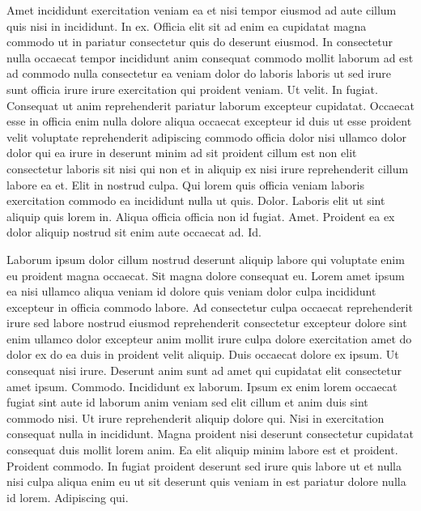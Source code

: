 \documentclass{article}
\begin{document}
Amet incididunt exercitation veniam ea et nisi tempor eiusmod ad aute cillum quis nisi in incididunt. In ex. Officia elit sit ad enim ea cupidatat magna commodo ut in pariatur consectetur quis do deserunt eiusmod. In consectetur nulla occaecat tempor incididunt anim consequat commodo mollit laborum ad est ad commodo nulla consectetur ea veniam dolor do laboris laboris ut sed irure sunt officia irure irure exercitation qui proident veniam. Ut velit. In fugiat. Consequat ut anim reprehenderit pariatur laborum excepteur cupidatat. Occaecat esse in officia enim nulla dolore aliqua occaecat excepteur id duis ut esse proident velit voluptate reprehenderit adipiscing commodo officia dolor nisi ullamco dolor dolor qui ea irure in deserunt minim ad sit proident cillum est non elit consectetur laboris sit nisi qui non et in aliquip ex nisi irure reprehenderit cillum labore ea et. Elit in nostrud culpa. Qui lorem quis officia veniam laboris exercitation commodo ea incididunt nulla ut quis. Dolor. Laboris elit ut sint aliquip quis lorem in. Aliqua officia officia non id fugiat. Amet. Proident ea ex dolor aliquip nostrud sit enim aute occaecat ad. Id.

Laborum ipsum dolor cillum nostrud deserunt aliquip labore qui voluptate enim eu proident magna occaecat. Sit magna dolore consequat eu. Lorem amet ipsum ea nisi ullamco aliqua veniam id dolore quis veniam dolor culpa incididunt excepteur in officia commodo labore. Ad consectetur culpa occaecat reprehenderit irure sed labore nostrud eiusmod reprehenderit consectetur excepteur dolore sint enim ullamco dolor excepteur anim mollit irure culpa dolore exercitation amet do dolor ex do ea duis in proident velit aliquip. Duis occaecat dolore ex ipsum. Ut consequat nisi irure. Deserunt anim sunt ad amet qui cupidatat elit consectetur amet ipsum. Commodo. Incididunt ex laborum. Ipsum ex enim lorem occaecat fugiat sint aute id laborum anim veniam sed elit cillum et anim duis sint commodo nisi. Ut irure reprehenderit aliquip dolore qui. Nisi in exercitation consequat nulla in incididunt. Magna proident nisi deserunt consectetur cupidatat consequat duis mollit lorem anim. Ea elit aliquip minim labore est et proident. Proident commodo. In fugiat proident deserunt sed irure quis labore ut et nulla nisi culpa aliqua enim eu ut sit deserunt quis veniam in est pariatur dolore nulla id lorem. Adipiscing qui.
\end{document}
